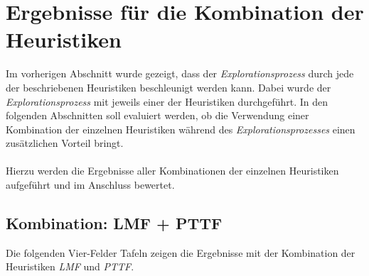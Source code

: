 \section{Ergebnisse für die Kombination der Heuristiken}\label{sec_evalKombis}
Im vorherigen Abschnitt wurde gezeigt, dass der \emph{Explorationsprozess} durch jede der beschriebenen \Gls{Heuristik}en beschleunigt werden kann. Dabei wurde der \emph{Explorationsprozess} mit jeweils einer der \Gls{Heuristik}en durchgeführt. In den folgenden Abschnitten soll evaluiert werden, ob die Verwendung einer Kombination der einzelnen \Gls{Heuristik}en während des \emph{Explorationsprozesses} einen zusätzlichen Vorteil bringt.
\\\\
Hierzu werden die Ergebnisse aller Kombinationen der einzelnen \Gls{Heuristik}en aufgeführt und im Anschluss bewertet.
\subsection{Kombination: LMF + PTTF}\label{sec_evalLMFPTTF}
Die folgenden Vier-Felder Tafeln zeigen die Ergebnisse mit der Kombination der \Gls{Heuristik}en \emph{LMF} und \emph{PTTF}.
\begin{multicols}{3}
\columnbreak
{}\columnbreak
{}
\end{multicols}

\begin{multicols}{2}
\columnbreak
{}
\end{multicols}

\begin{multicols}{2}
\columnbreak
{}
\end{multicols}

\begin{multicols}{2}
\columnbreak
{}
\end{multicols}

